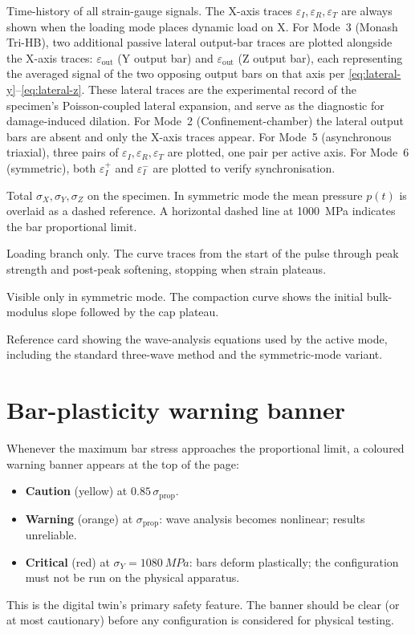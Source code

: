 \documentclass[11pt,a4paper,openany]{book}
\providecommand{\SI}[2]{\qty{#1}{#2}}
\theoremstyle{handbook}
\newcommand{\sig}{\sigma}
\newcommand{\eps}{\varepsilon}
\newcommand{\sigprop}{\sig_{\text{prop}}}
\begin{document}
\begin{description}[leftmargin=2em,style=nextline]
  \item[Bar waveforms] Time-history of all strain-gauge signals. The
    X-axis traces $\eps_I,\eps_R,\eps_T$ are always shown when the
    loading mode places dynamic load on X. For Mode~3 (Monash Tri-HB),
    two additional passive lateral output-bar traces are plotted
    alongside the X-axis traces: $\eps_{\text{out}}$ (Y output bar) and
    $\eps_{\text{out}}$ (Z output bar), each representing the averaged
    signal of the two opposing output bars on that axis per
    \eqref{eq:lateral-y}--\eqref{eq:lateral-z}. These lateral traces are
    the experimental record of the specimen's Poisson-coupled lateral
    expansion, and serve as the diagnostic for damage-induced dilation.
    For Mode~2 (Confinement-chamber) the lateral output bars are absent
    and only the X-axis traces appear. For Mode~5 (asynchronous
    triaxial), three pairs of $\eps_I,\eps_R,\eps_T$ are plotted, one
    pair per active axis. For Mode~6 (symmetric), both $\eps_I^{+}$ and
    $\eps_I^{-}$ are plotted to verify synchronisation.
  \item[Specimen stresses] Total $\sig_X,\sig_Y,\sig_Z$ on the specimen.
    In symmetric mode the mean pressure $p(t)$ is overlaid as a dashed
    reference. A horizontal dashed line at \SI{1000}{MPa} indicates the
    bar proportional limit.
  \item[$\sig$--$\eps$ curve] Loading branch only. The curve traces from
    the start of the pulse through peak strength and post-peak softening,
    stopping when strain plateaus.
  \item[$p$--$\eps_v$] Visible only in symmetric mode. The compaction
    curve shows the initial bulk-modulus slope followed by the cap
    plateau.
  \item[Equations] Reference card showing the wave-analysis equations
    used by the active mode, including the standard three-wave method
    and the symmetric-mode variant.
\end{description}

\section{Bar-plasticity warning banner}

Whenever the maximum bar stress approaches the proportional limit, a
coloured warning banner appears at the top of the page:
\begin{itemize}[leftmargin=*,itemsep=2pt]
  \item \textcolor{warnorange}{\textbf{Caution}} (yellow) at
        $0.85\,\sigprop$.
  \item \textcolor{warnorange}{\textbf{Warning}} (orange) at $\sigprop$:
        wave analysis becomes nonlinear; results unreliable.
  \item \textcolor{dangerred}{\textbf{Critical}} (red) at
        $\sig_Y=\SI{1080}{MPa}$: bars deform plastically; the
        configuration must not be run on the physical apparatus.
\end{itemize}
This is the digital twin's primary safety feature. The banner should be
clear (or at most cautionary) before any configuration is considered for
physical testing.
\end{document}
